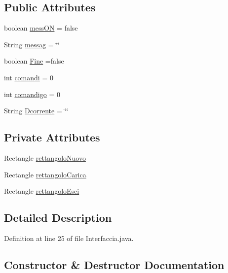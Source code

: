 \subsection*{Public Attributes}
\begin{DoxyCompactItemize}
\item 
boolean \hyperlink{classa_1_1survival_1_1game_1_1_interfaccia_a53638d8b01e1903b2c724ef960d9d51d}{mess\+ON} = false
\item 
String \hyperlink{classa_1_1survival_1_1game_1_1_interfaccia_abe702b74b2a1a486bd641ce9b6c56f79}{messag} = \char`\"{}\char`\"{}
\item 
boolean \hyperlink{classa_1_1survival_1_1game_1_1_interfaccia_af01195fe9c733fd0a6c3eebcf8b31777}{Fine} =false
\item 
int \hyperlink{classa_1_1survival_1_1game_1_1_interfaccia_a649a8655713bf0e8464a2a3a957c26d4}{comandi} = 0
\item 
int \hyperlink{classa_1_1survival_1_1game_1_1_interfaccia_aa1be8778fa46376bbd32e59db2ed3a33}{comandigo} = 0
\item 
String \hyperlink{classa_1_1survival_1_1game_1_1_interfaccia_a642bb62c6c1f15bd181a60884ced61b7}{Dcorrente} = \char`\"{}\char`\"{}
\end{DoxyCompactItemize}
\subsection*{Private Attributes}
\begin{DoxyCompactItemize}
\item 
Rectangle \hyperlink{classa_1_1survival_1_1game_1_1_interfaccia_abe31ab860ef846d30a5e7b91253e3ff5}{rettangolo\+Nuovo}
\item 
Rectangle \hyperlink{classa_1_1survival_1_1game_1_1_interfaccia_a2adab04fb2a98335bebb9fa899cb60ad}{rettangolo\+Carica}
\item 
Rectangle \hyperlink{classa_1_1survival_1_1game_1_1_interfaccia_a799e22b4be0cc2c5bf997bfaf99be31b}{rettangolo\+Esci}
\end{DoxyCompactItemize}


\subsection{Detailed Description}


Definition at line 25 of file Interfaccia.\+java.



\subsection{Constructor \& Destructor Documentation}
\mbox{\label{classa_1_1survival_1_1game_1_1_interfaccia_adcff06a15c5f6ba258455f184dd915fb}} 
